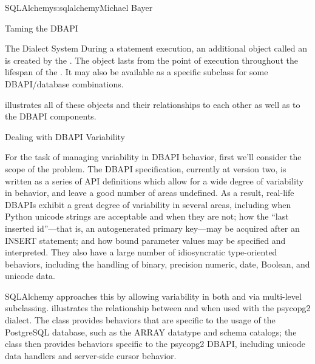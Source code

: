 \begin{aosachapter}{SQLAlchemy}{s:sqlalchemy}{Michael Bayer}
\begin{aosasect1}{Taming the DBAPI}
\begin{aosasect2}{The Dialect System}
During a statement execution, an additional object called an
 is created by the . The object lasts from the
point of execution throughout the lifespan of the . It
may also be available as a specific subclass for some DBAPI/database
combinations.

 illustrates all of these objects and their relationships to each
other as well as to the DBAPI components.


\end{aosasect2}

\begin{aosasect2}{Dealing with DBAPI Variability}

For the task of managing variability in DBAPI behavior,
first we'll consider the scope of the problem. The DBAPI
specification, currently at version two, is written as a series of
API definitions which allow for a wide degree of variability in
behavior, and leave a good number of areas undefined.  As a result, real-life
DBAPIs exhibit a great degree of variability
in several areas, including when Python
unicode strings are acceptable and when they are not; how the
``last inserted id''---that is, an autogenerated primary key---may be
acquired after an INSERT statement; and how bound parameter values
may be specified and interpreted. They also have a large number of idiosyncratic type-oriented
behaviors, including the handling of binary, precision numeric, date,
Boolean, and unicode data.

SQLAlchemy approaches this by allowing variability in both  and
 via multi-level subclassing.    illustrates
the relationship between  and \linebreak
{} when
used with the psycopg2 dialect.  The  class provides behaviors that
are specific to the usage of the PostgreSQL database, such as the ARRAY datatype
and schema catalogs; the 
class then provides behaviors specific to the psycopg2 DBAPI, including
unicode data handlers and server-side cursor behavior.



\end{aosasect2}
\end{aosasect1}
\end{aosachapter}
